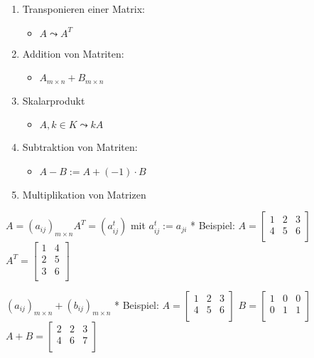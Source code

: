 \documentclass{../tudscript}
\begin{document}
\begin{enumerate}
\def\labelenumi{\arabic{enumi}.}
\tightlist
\item
  Transponieren einer Matrix:

  \begin{itemize}
  \tightlist
  \item
    \(A \leadsto A^T\)
  \end{itemize}
\item
  Addition von Matriten:

  \begin{itemize}
  \tightlist
  \item
    \(A_{m \times n}+ B_{m \times n}\)
  \end{itemize}
\item
  Skalarprodukt

  \begin{itemize}
  \tightlist
  \item
    \(A, k \in K \leadsto kA\)
  \end{itemize}
\item
  Subtraktion von Matriten:

  \begin{itemize}
  \tightlist
  \item
    \(A-B := A+(-1) \cdot B\)
  \end{itemize}
\item
  Multiplikation von Matrizen
\end{enumerate}

\hypertarget{zu-1.}{%
\label{zu-1.}}

\(A= (a_{ij})_{m \times n} A^T= (a^t_{ij})\) mit \(a^t_{ij} := a_{ji}\)
* Beispiel:
\(A=\begin{bmatrix}  1 & 2 & 3\\  4 & 5 & 6 \\ \end{bmatrix}\)
\(A^T=\begin{bmatrix}  1 & 4 \\  2 & 5 \\  3 & 6 \\ \end{bmatrix}\)

\hypertarget{zu-2.}{%
\label{zu-2.}}

\((a_{ij})_{m \times n} + (b_{ij})_{m \times n}\) * Beispiel:
\(A=\begin{bmatrix}  1 & 2 & 3 \\  4 & 5 & 6 \\ \end{bmatrix}\)
\(B= \begin{bmatrix}  1 & 0 & 0 \\  0 & 1 & 1 \\ \end{bmatrix}\)
\(A+B = \begin{bmatrix}  2 & 2 & 3 \\  4 & 6 & 7 \\ \end{bmatrix}\)
\end{document}
